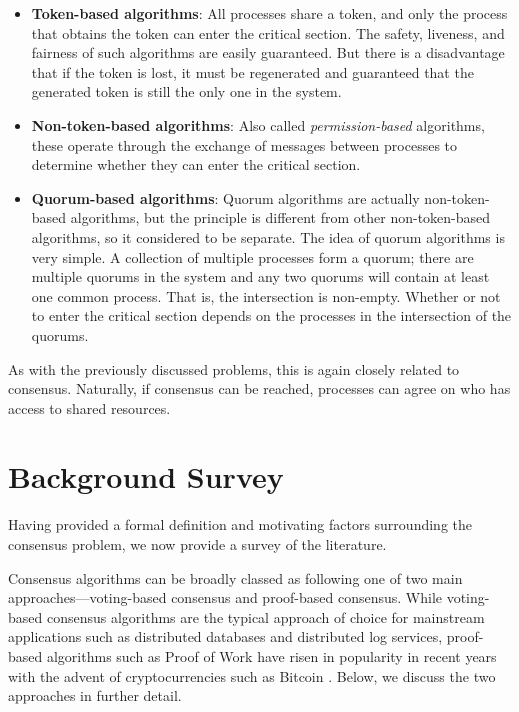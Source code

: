 \documentclass[12pt, a4paper]{article}
\begin{document}
\begin{itemize}
  \item \textbf{Token-based algorithms}: All processes share a token, and only the process that obtains the token can enter the critical section. The safety, liveness, and fairness of such algorithms are easily guaranteed. But there is a disadvantage that if the token is lost, it must be regenerated and guaranteed that the generated token is still the only one in the system.
  \item \textbf{Non-token-based algorithms}: Also called \textit{permission-based} algorithms, these operate through the exchange of messages between processes to determine whether they can enter the critical section.
  \item \textbf{Quorum-based algorithms}: Quorum algorithms are actually non-token-based algorithms, but the principle is different from other non-token-based algorithms, so it considered to be separate. The idea of quorum algorithms is very simple. A collection of multiple processes form a quorum; there are multiple quorums in the system and any two quorums will contain at least one common process. That is, the intersection is non-empty. Whether or not to enter the critical section depends on the processes in the intersection of the quorums.
\end{itemize}

As with the previously discussed problems, this is again closely related to consensus. Naturally, if consensus can be reached, processes can agree on who has access to shared resources.


\section{Background Survey} \label{sec:background}

Having provided a formal definition and motivating factors surrounding the consensus problem, we now provide a survey of the literature.

Consensus algorithms can be broadly classed as following one of two main approaches---voting-based consensus and proof-based consensus. While voting-based consensus algorithms are the typical approach of choice for mainstream applications such as distributed databases and distributed log services, proof-based algorithms such as Proof of Work have risen in popularity in recent years with the advent of cryptocurrencies such as Bitcoin \cite{nakamoto2019bitcoin}. Below, we discuss the two approaches in further detail.
\end{document}
